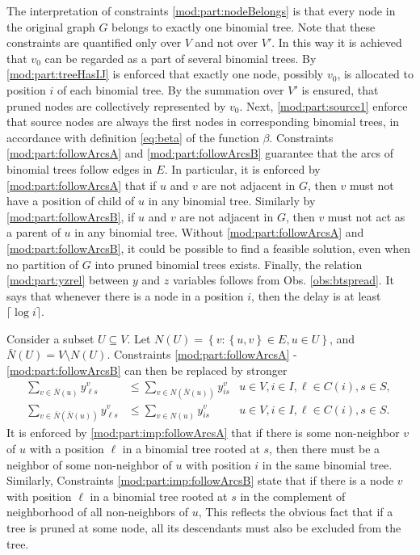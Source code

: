 The interpretation of constraints \eqref{mod:part:nodeBelongs} is that every node in the original graph $G$ belongs to exactly one binomial tree.
Note that these constraints are quantified only over $V$ and not over $V'$.
In this way it is achieved that $v_0$ can be regarded as a part of several binomial trees.
By \eqref{mod:part:treeHasIJ} is enforced that exactly one node, possibly $v_0$, is allocated to position $i$ of each binomial tree.
By the summation over $V'$ is ensured, that pruned nodes are collectively represented by $v_0$.
Next, \eqref{mod:part:source1} enforce that source nodes are always the first nodes in corresponding binomial trees, 
in accordance with definition \eqref{eq:beta} of the function $\beta$.
Constraints \eqref{mod:part:followArcsA} and \eqref{mod:part:followArcsB} guarantee that the arcs of binomial trees follow edges in $E$.
In particular, it is enforced by \eqref{mod:part:followArcsA} that if $u$ and $v$ are not adjacent in $G$, 
then $v$ must not have a position of child of $u$ in any binomial tree.
Similarly by \eqref{mod:part:followArcsB}, if $u$ and $v$ are not adjacent in $G$, then $v$ must not act as a parent of $u$ in any binomial tree.
Without \eqref{mod:part:followArcsA} and \eqref{mod:part:followArcsB}, it could be possible to find a feasible solution, 
even when no partition of $G$ into pruned binomial trees exists.
Finally, the relation \eqref{mod:part:yzrel} between $y$ and $z$ variables follows from Obs. \ref{obs:btspread}.
It says that whenever there is a node in a position $i$, then the delay is at least $\lceil\log i\rceil$.

Consider a subset $U\subseteq V$.
Let $N(U)=\left\{v:\left\{u,v\right\}\in E, u\in U\right\}$, and $\bar{N}(U)=V\setminus N(U)$.
Constraints \eqref{mod:part:followArcsA} - \eqref{mod:part:followArcsB} can then be replaced by stronger
\begin{subequations}\label{mod:partition:imp}
\begin{align}
\label{mod:part:imp:followArcsA}\sum\limits_{v\in \bar{N}(u)}y^v_{\ell s}&\leq \sum\limits_{v\in N(\bar{N}(u))}y_{is}^{v} & u\in V,i\in I,\ell\in C(i), s\in S,  \\
\label{mod:part:imp:followArcsB}\sum\limits_{v\in \bar{N}(\bar{N}(u))}y^v_{\ell s}&\leq \sum\limits_{v\in N(u)} y_{is}^{v} & u\in V,i\in I,\ell\in C(i), s\in S.
\end{align}~
\end{subequations}
It is enforced by \eqref{mod:part:imp:followArcsA} that if there is some  non-neighbor $v$ of $u$  with a position $\ell$ in a binomial tree rooted at $s$,
then there must be a neighbor of some non-neighbor of $u$ with position $i$ in the same binomial tree.
Similarly, Constraints \eqref{mod:part:imp:followArcsB} state 
that if there is a node $v$ with position $\ell$ in a binomial tree rooted at $s$ in the complement of neighborhood of all non-neighbors of $u$,
This reflects the obvious fact that if a tree is pruned at some node, all its descendants must also be excluded from the tree.
